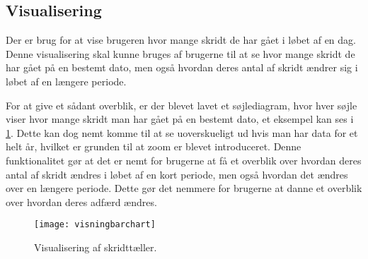 \subsection{Visualisering}\label{sec:aktivitetVis}
Der er brug for at vise brugeren hvor mange skridt de har gået i løbet af en dag.
Denne visualisering skal kunne bruges af brugerne til at se hvor mange skridt de har gået på en bestemt dato, men også hvordan deres antal af skridt ændrer sig i løbet af en længere periode.

For at give et sådant overblik, er der blevet lavet et søjlediagram, hvor hver søjle viser hvor mange skridt man har gået på en bestemt dato, et eksempel kan ses i \cref{fig:skridttaeller}.
Dette kan dog nemt komme til at se uoverskueligt ud hvis man har data for et helt år, hvilket er grunden til at zoom er blevet introduceret.
Denne funktionalitet gør at det er nemt for brugerne at få et overblik over hvordan deres antal af skridt ændres i løbet af en kort periode, men også hvordan det ændres over en længere periode.
Dette gør det nemmere for brugerne at danne et overblik over hvordan deres adfærd ændres.

\begin{figure}[h]
	\centering
	\texttt{[image: visningbarchart]}
	\caption{Visualisering af skridttæller.}
	\label{fig:skridttaeller}
\end{figure}